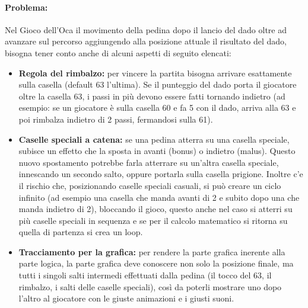 \documentclass[a4paper,12pt]{report}
\begin{document}
\paragraph{Problema:}Nel Gioco dell'Oca il movimento della pedina dopo il lancio del dado oltre ad avanzare sul percorso aggiungendo alla posizione attuale il risultato del dado, bisogna tener conto anche di alcuni aspetti di seguito elencati:
\begin{itemize}
	\item \textbf{Regola del rimbalzo:} per vincere la partita bisogna arrivare esattamente sulla casella (default 63 l'ultima). Se il punteggio del dado porta il giocatore oltre la casella 63, i passi in più devono essere fatti tornando indietro (ad esempio: se un giocatore è sulla casella 60 e fa 5 con il dado, arriva alla 63 e poi rimbalza indietro di 2 passi, fermandosi sulla 61).
    \item \textbf{Caselle speciali a catena:} se una pedina atterra su una casella speciale, subisce un effetto che la sposta in avanti (bonus) o indietro (malus). Questo nuovo spostamento potrebbe farla atterrare su un'altra casella speciale, innescando un secondo salto, oppure portarla sulla casella prigione. Inoltre c'e il rischio che, posizionando caselle speciali casuali, si può creare un ciclo infinito (ad esempio una casella che manda avanti di 2 e subito dopo una che manda indietro di 2), bloccando il gioco, questo anche nel caso si atterri su più caselle speciali in sequenza e se per il calcolo matematico si ritorna su quella di partenza si crea un loop.
    \item \textbf{Tracciamento per la grafica:} per rendere la parte grafica inerente alla parte logica, la parte grafica deve conoscere non solo la posizione finale, ma tutti i singoli salti intermedi effettuati dalla pedina (il tocco del 63, il rimbalzo, i salti delle caselle speciali), così da poterli mostrare uno dopo l'altro al giocatore con le giuste animazioni e i giusti suoni.
\end{itemize}
\end{document}
